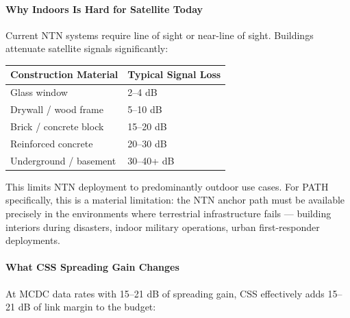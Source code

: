 \documentclass[
  11pt,
]{article}
\begin{document}
\hypertarget{why-indoors-is-hard-for-satellite-today}{%
\paragraph{Why Indoors Is Hard for Satellite
Today}\label{why-indoors-is-hard-for-satellite-today}}

Current NTN systems require line of sight or near-line of sight.
Buildings attenuate satellite signals significantly:

\begin{longtable}[]{@{}ll@{}}
\toprule\noalign{}
Construction Material & Typical Signal Loss \\
\midrule\noalign{}
\endhead
\bottomrule\noalign{}
\endlastfoot
Glass window & 2--4 dB \\
Drywall / wood frame & 5--10 dB \\
Brick / concrete block & 15--20 dB \\
Reinforced concrete & 20--30 dB \\
Underground / basement & 30--40+ dB \\
\end{longtable}

This limits NTN deployment to predominantly outdoor use cases. For PATH
specifically, this is a material limitation: the NTN anchor path must be
available precisely in the environments where terrestrial infrastructure
fails --- building interiors during disasters, indoor military
operations, urban first-responder deployments.

\hypertarget{what-css-spreading-gain-changes}{%
\paragraph{What CSS Spreading Gain
Changes}\label{what-css-spreading-gain-changes}}

At MCDC data rates with 15--21 dB of spreading gain, CSS effectively
adds 15--21 dB of link margin to the budget:
\end{document}
